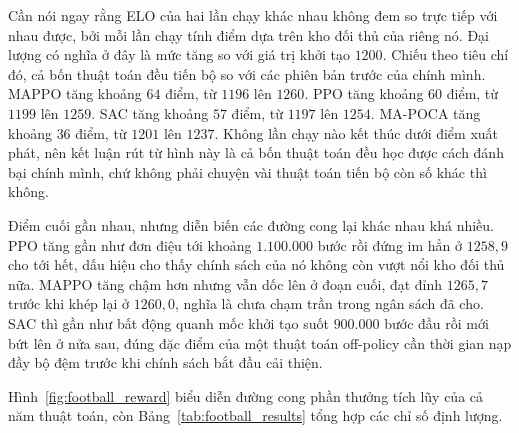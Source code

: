 \indent Cần nói ngay rằng ELO của hai lần chạy khác nhau không đem so trực tiếp với nhau
được, bởi mỗi lần chạy tính điểm dựa trên kho đối thủ của riêng nó. Đại lượng có nghĩa ở
đây là mức tăng so với giá trị khởi tạo $1200$. Chiếu theo tiêu chí đó, cả bốn
thuật toán đều tiến bộ so với các phiên bản trước của chính mình. MAPPO tăng khoảng $64$ điểm,
từ $1196$ lên $1260$. PPO tăng khoảng $60$ điểm, từ $1199$ lên $1259$. SAC tăng khoảng $57$
điểm, từ $1197$ lên $1254$. MA-POCA tăng khoảng $36$ điểm, từ $1201$ lên $1237$. Không lần chạy
nào kết thúc dưới điểm xuất phát, nên kết luận
rút từ hình này là cả bốn thuật toán đều học được cách đánh bại chính mình, chứ không phải
chuyện vài thuật toán tiến bộ còn số khác thì không.

\indent Điểm cuối gần nhau, nhưng diễn biến các đường cong lại khác nhau khá nhiều. PPO
tăng gần như đơn điệu tới khoảng $1.100.000$ bước rồi đứng im hẳn ở
$1258{,}9$ cho tới hết, dấu hiệu cho thấy chính sách của nó không còn vượt nổi kho đối thủ
nữa. MAPPO tăng chậm hơn nhưng vẫn dốc lên ở đoạn cuối, đạt đỉnh $1265{,}7$ trước khi khép lại
ở $1260{,}0$, nghĩa là chưa chạm trần trong ngân sách đã cho. SAC thì gần như bất động quanh
mốc khởi tạo suốt $900.000$ bước đầu rồi mới bứt lên ở nửa sau, đúng đặc
điểm của một thuật toán off-policy cần thời gian nạp đầy bộ đệm trước khi chính sách bắt
đầu cải thiện.

\indent Hình~\ref{fig:football_reward} biểu diễn đường cong phần thưởng tích lũy của cả
năm thuật toán, còn Bảng~\ref{tab:football_results} tổng hợp các chỉ số định lượng.

